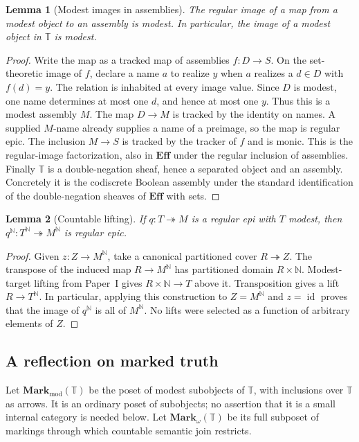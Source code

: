 \documentclass[11pt,a4paper]{article}
\numberwithin{equation}{section}
\newtheorem{lemma}[lemma]{Lemma}
\theoremstyle{definition}
\theoremstyle{remark}
\theoremstyle{plain}
\newcommand{\E}{\mathbf{Eff}}
\newcommand{\N}{\mathbb N}
\newcommand{\TV}{\mathbb T}
\newcommand{\id}{\operatorname{id}}
\newcommand{\onto}{\twoheadrightarrow}
\newcommand{\Mark}{\mathbf{Mark}_{\mathrm{mod}}}
\newcommand{\JoinMark}{\mathbf{Mark}_{\omega}}
\begin{document}
\begin{lemma}[Modest images in assemblies]
\label{lem:modest-image}
The regular image of a map from a modest object to an assembly is modest.
In particular, the image of a modest object in $\TV$ is modest.
\end{lemma}
\begin{proof}
Write the map as a tracked map of assemblies $f:D\to S$. On the
set-theoretic image of $f$, declare a name $a$ to realize $y$ when $a$
realizes a $d\in D$ with $f(d)=y$. The relation is inhabited at every
image value. Since $D$ is modest, one name determines at most one $d$,
and hence at most one $y$. Thus this is a modest assembly $M$.
The map $D\to M$ is tracked by the identity on names. A supplied
$M$-name already supplies a name of a preimage, so the map is regular
epic. The inclusion $M\to S$ is tracked by the tracker of $f$ and is
monic. This is the regular-image factorization, also in $\E$ under the
regular inclusion of assemblies. Finally $\TV$ is a double-negation
sheaf, hence a separated object and an assembly. Concretely it is the
codiscrete Boolean assembly under the standard identification of the
double-negation sheaves of $\E$ with sets.
\end{proof}

\begin{lemma}[Countable lifting]
\label{lem:countable-cover-lifting}
If $q:T\onto M$ is a regular epi with $T$ modest, then
$q^{\N}:T^{\N}\onto M^{\N}$ is regular epic.
\end{lemma}
\begin{proof}
Given $z:Z\to M^{\N}$, take a canonical partitioned cover
$R\onto Z$. The transpose of the induced map $R\to M^{\N}$ has
partitioned domain $R\times\N$. Modest-target lifting from Paper~I
gives $R\times\N\to T$ above it. Transposition gives a lift
$R\to T^{\N}$. In particular, applying this construction to
$Z=M^{\N}$ and $z=\id$ proves that the image of $q^{\N}$ is all
of $M^{\N}$. No lifts were selected as a function of arbitrary elements
of $Z$.
\end{proof}

\subsection{A reflection on marked truth}

Let $\Mark(\TV)$ be the poset of modest subobjects of $\TV$, with
inclusions over $\TV$ as arrows. It is an ordinary poset of subobjects;
no assertion that it is a small internal category is needed below.
Let $\JoinMark(\TV)$ be its full subposet of markings through which
countable semantic join restricts.
\end{document}
